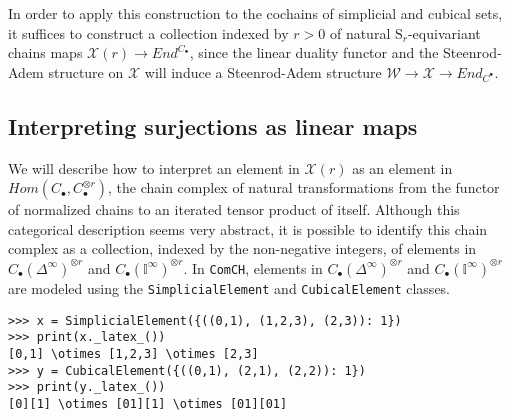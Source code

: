 \documentclass{amsart}
\renewcommand{\S}{\mathrm S}
\newcommand{\comch}{\texttt{ComCH}}
\newcommand{\X}{\mathcal X}
\begin{document}
In order to apply this construction to the cochains of simplicial and cubical sets, it suffices to construct a collection indexed by $r>0$ of natural $\S_r$-equivariant chains maps $\X(r) \to End^{C_\bullet}$, since the linear duality functor and the Steenrod-Adem structure on $\X$ will induce a Steenrod-Adem structure $\mathcal W \to \X \to End_{C^\bullet}$.

\subsection{Interpreting surjections as linear maps}

We will describe how to interpret an element in $\X(r)$ as an element in $Hom(C_\bullet, C_\bullet^{\otimes r})$, the chain complex of natural transformations from the functor of normalized chains to an iterated tensor product of itself. Although this categorical description seems very abstract, it is possible to identify this chain complex as a collection, indexed by the non-negative integers, of elements in $C_\bullet(\Delta^\infty)^{\otimes r}$ and $C_\bullet(\mathbb I^\infty)^{\otimes r}$. In \comch, elements in $C_\bullet(\Delta^\infty)^{\otimes r}$ and $C_\bullet(\mathbb I^\infty)^{\otimes r}$ are modeled using the \texttt{SimplicialElement} and \texttt{CubicalElement} classes.
\begin{verbatim}
>>> x = SimplicialElement({((0,1), (1,2,3), (2,3)): 1})
>>> print(x._latex_())
[0,1] \otimes [1,2,3] \otimes [2,3]
>>> y = CubicalElement({((0,1), (2,1), (2,2)): 1})
>>> print(y._latex_())
[0][1] \otimes [01][1] \otimes [01][01]
\end{verbatim}
\end{document}
